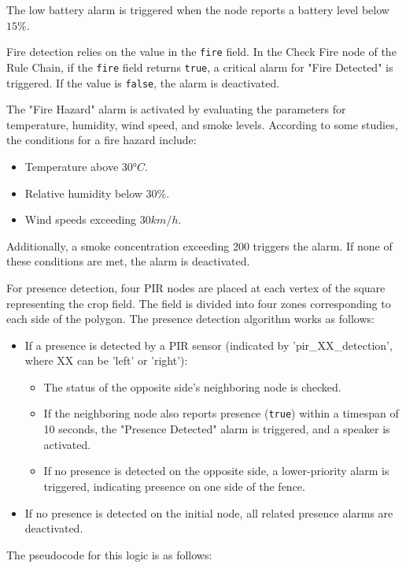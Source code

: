 The low battery alarm is triggered when the node reports a battery level below $15\%$.

Fire detection relies on the value in the \texttt{fire} field. In the Check Fire node of the Rule Chain, if the \texttt{fire} field returns \texttt{true}, a critical alarm for "Fire Detected"
is triggered. If the value is \texttt{false}, the alarm is deactivated.

The "Fire Hazard" alarm is activated by evaluating the parameters for temperature, humidity, wind speed, and smoke levels. According to some studies\cite{norma303030tres}, the conditions 
for a fire hazard include:
\begin{itemize}
    \item Temperature above $30$°$C$.
    \item Relative humidity below $30\%$.
    \item Wind speeds exceeding $30 km/h$.
\end{itemize}

Additionally, a smoke concentration exceeding 200  triggers the alarm. If none of these conditions are met, the alarm is deactivated.

For presence detection, four PIR nodes are placed at each vertex of the square representing the crop field. The field is divided into four zones corresponding to each side 
of the polygon. The presence detection algorithm works as follows:
\begin{itemize}
    \item If a presence is detected by a PIR sensor (indicated by 'pir\_XX\_detection', where XX can be 'left' or 'right'):
    \begin{itemize}
        \item The status of the opposite side’s neighboring node is checked.
        \item If the neighboring node also reports presence (\texttt{true}) within a timespan of 10 seconds, the "Presence Detected" alarm is triggered, and a speaker is activated.
        \item If no presence is detected on the opposite side, a lower-priority alarm is triggered, indicating presence on one side of the fence.
    \end{itemize}
    \item If no presence is detected on the initial node, all related presence alarms are deactivated. 
\end{itemize}

The pseudocode for this logic is as follows:


